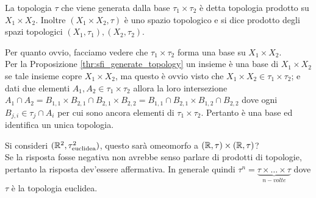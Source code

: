 \begin{definition}
	La topologia $\tau$ che viene generata dalla base $\tau_1 \times \tau_2$ è detta topologia prodotto su $X_1 \times X_2$. Inoltre $(X_1 \times X_2, \tau)$ è uno spazio topologico e si dice prodotto degli spazi topologici $(X_1, \tau_1), (X_2, \tau_2)$.
\end{definition}

\begin{remark}
	Per quanto ovvio, facciamo vedere che $\tau_1 \times \tau_2$ forma una base su $X_1 \times X_2$. \\ Per la Proposizione \ref{thr:sfi_generate_topology} un insieme è una base di $X_1 \times X_2$ se tale insieme copre $X_1 \times X_2$, ma questo è ovvio visto che $X_1 \times X_2 \in \tau_1 \times \tau_2$; e dati due elementi $A_1, A_2 \in \tau_1 \times \tau_2$ allora la loro intersezione $A_1 \cap A_2 = B_{1,1} \times B_{2,1} \cap B_{2,1} \times B_{2,2} = B_{1,1}\cap B_{2,1} \times B_{1,2} \cap B_{2,2}$ dove ogni $B_{j,i} \in \tau_j \cap A_i$ per cui sono ancora elementi di $\tau_1 \times \tau_2$. Pertanto è una base ed identifica un unica topologia.
\end{remark}

\begin{example}
	Si consideri $(\mathbb{R}^2, \tau^2_{\text{euclidea}})$, questo sarà omeomorfo a $(\mathbb{R}, \tau) \times (\mathbb{R}, \tau)$? \\ Se la risposta fosse negativa non avrebbe senso parlare di prodotti di topologie, pertanto la risposta dev'essere affermativa. 
	In generale quindi $\tau^n = \underset{n-volte}{\underbrace{\tau \times \dots \times \tau}}$ dove $\tau$ è la topologia euclidea. 
\end{example}

